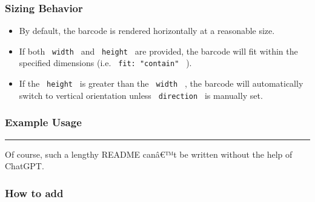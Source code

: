 \subsubsection{Sizing Behavior}\label{sizing-behavior}

\begin{itemize}
\tightlist
\item
  By default, the barcode is rendered horizontally at a reasonable size.
\item
  If both \texttt{\ width\ } and \texttt{\ height\ } are provided, the
  barcode will fit within the specified dimensions (i.e.
  \texttt{\ fit:\ "contain"\ } ).
\item
  If the \texttt{\ height\ } is greater than the \texttt{\ width\ } ,
  the barcode will automatically switch to vertical orientation unless
  \texttt{\ direction\ } is manually set.
\end{itemize}

\subsubsection{Example Usage}\label{example-usage}

\begin{Shaded}
\begin{Highlighting}[]



\end{Highlighting}
\end{Shaded}

\begin{center}\rule{0.5\linewidth}{0.5pt}\end{center}

{Of course, such a lengthy README canâ€™t be written without the help of
ChatGPT.}

\subsubsection{How to add}\label{how-to-add}

